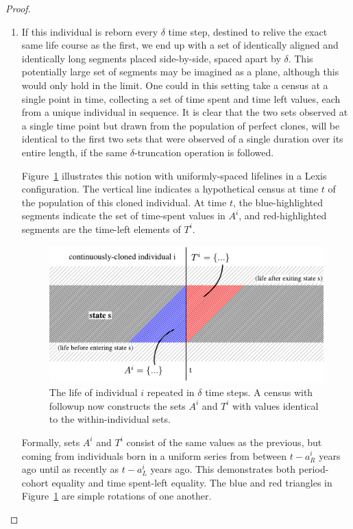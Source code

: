 \documentclass[12pt,oneside,a4paper]{article} %
\theoremstyle{definition}
\begin{document}
\begin{proof}
\begin{enumerate}
\FloatBarrier
\item{} If this individual is reborn every $\delta$ time step, destined to
relive the exact same life course as the first, we end up with a set of
identically aligned and identically long segments placed side-by-side, spaced
apart by $\delta$.
This potentially large set of segments may be imagined as a plane, although this
would only hold in the limit.
One could in this setting take a census at a single point in time, collecting a set of
time spent and time left values, each from a unique individual in sequence. It
is clear that the two sets observed at a single time point but drawn from the population of
perfect clones, will be identical to the first two sets that were observed of a single duration over its entire length, if the same
$\delta$-truncation operation is followed.

Figure~\ref{fig:clones} illustrates this notion with uniformly-spaced lifelines
in a Lexis configuration. The vertical line indicates a hypothetical census at time $t$ of
the population of this cloned individual. At time $t$, the blue-highlighted segments indicate
the set of time-spent values in $A^i$, and red-highlighted segments are the
time-left elements of $T^i$. 

 \begin{figure}[h!]
\centering
\caption{The life of individual $i$ repeated in $\delta$ time steps. A
census with followup now constructs the sets $A^i$ and $T^i$ with values
identical to the within-individual sets.}
\label{fig:clones}
\includegraphics[scale=.8]{Figures/lifelinerepeated.pdf}
\end{figure}

Formally, sets $A^i$ and $T^i$ consist of the same values as the previous, but
coming from individuals born in a uniform series from between $t-a_R^i$ years
ago until as recently as $t-a_L^i$ years ago. This demonstrates both
period-cohort equality and time spent-left equality. The blue and red triangles in
Figure~\ref{fig:clones} are simple rotations of one another.


\end{enumerate}
\end{proof}
\end{document}
